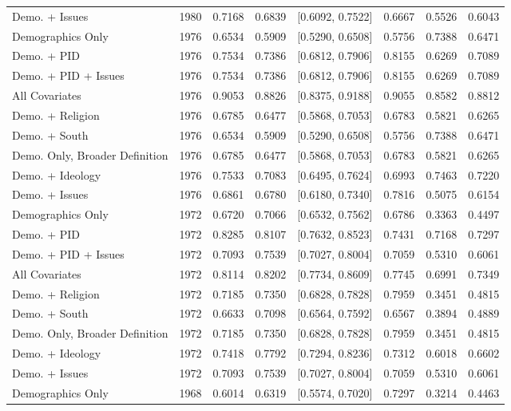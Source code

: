 \begin{longtable}{lrrrlrrr}
  Demo. + Issues & 1980 & 0.7168 & 0.6839 & [0.6092, 0.7522] & 0.6667 & 0.5526 & 0.6043 \\ 
  Demographics Only & 1976 & 0.6534 & 0.5909 & [0.5290, 0.6508] & 0.5756 & 0.7388 & 0.6471 \\ 
  Demo. + PID & 1976 & 0.7534 & 0.7386 & [0.6812, 0.7906] & 0.8155 & 0.6269 & 0.7089 \\ 
  Demo. + PID + Issues & 1976 & 0.7534 & 0.7386 & [0.6812, 0.7906] & 0.8155 & 0.6269 & 0.7089 \\ 
  All Covariates & 1976 & 0.9053 & 0.8826 & [0.8375, 0.9188] & 0.9055 & 0.8582 & 0.8812 \\ 
  Demo. + Religion & 1976 & 0.6785 & 0.6477 & [0.5868, 0.7053] & 0.6783 & 0.5821 & 0.6265 \\ 
  Demo. + South & 1976 & 0.6534 & 0.5909 & [0.5290, 0.6508] & 0.5756 & 0.7388 & 0.6471 \\ 
  Demo. Only, Broader Definition & 1976 & 0.6785 & 0.6477 & [0.5868, 0.7053] & 0.6783 & 0.5821 & 0.6265 \\ 
  Demo. + Ideology & 1976 & 0.7533 & 0.7083 & [0.6495, 0.7624] & 0.6993 & 0.7463 & 0.7220 \\ 
  Demo. + Issues & 1976 & 0.6861 & 0.6780 & [0.6180, 0.7340] & 0.7816 & 0.5075 & 0.6154 \\ 
  Demographics Only & 1972 & 0.6720 & 0.7066 & [0.6532, 0.7562] & 0.6786 & 0.3363 & 0.4497 \\ 
  Demo. + PID & 1972 & 0.8285 & 0.8107 & [0.7632, 0.8523] & 0.7431 & 0.7168 & 0.7297 \\ 
  Demo. + PID + Issues & 1972 & 0.7093 & 0.7539 & [0.7027, 0.8004] & 0.7059 & 0.5310 & 0.6061 \\ 
  All Covariates & 1972 & 0.8114 & 0.8202 & [0.7734, 0.8609] & 0.7745 & 0.6991 & 0.7349 \\ 
  Demo. + Religion & 1972 & 0.7185 & 0.7350 & [0.6828, 0.7828] & 0.7959 & 0.3451 & 0.4815 \\ 
  Demo. + South & 1972 & 0.6633 & 0.7098 & [0.6564, 0.7592] & 0.6567 & 0.3894 & 0.4889 \\ 
  Demo. Only, Broader Definition & 1972 & 0.7185 & 0.7350 & [0.6828, 0.7828] & 0.7959 & 0.3451 & 0.4815 \\ 
  Demo. + Ideology & 1972 & 0.7418 & 0.7792 & [0.7294, 0.8236] & 0.7312 & 0.6018 & 0.6602 \\ 
  Demo. + Issues & 1972 & 0.7093 & 0.7539 & [0.7027, 0.8004] & 0.7059 & 0.5310 & 0.6061 \\ 
  Demographics Only & 1968 & 0.6014 & 0.6319 & [0.5574, 0.7020] & 0.7297 & 0.3214 & 0.4463 \\ 

\end{longtable}
